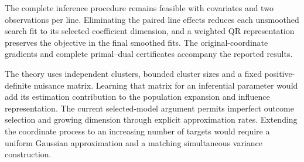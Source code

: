 The complete inference procedure remains feasible with
\SoyDimension{} covariates and two observations per line.
Eliminating the paired line effects reduces each unsmoothed search
fit to its selected coefficient dimension, and a weighted QR
representation preserves the objective in the final smoothed fits.
The original-coordinate gradients and complete primal--dual
certificates accompany the reported results.

The theory uses independent clusters, bounded cluster sizes and a
fixed positive-definite nuisance matrix. Learning that matrix for an
inferential parameter would add its estimation contribution to the
population expansion and influence representation. The current
selected-model argument permits imperfect outcome selection and
growing dimension through explicit approximation rates. Extending
the coordinate process to an increasing number of targets would
require a uniform Gaussian approximation and a matching simultaneous
variance construction.
